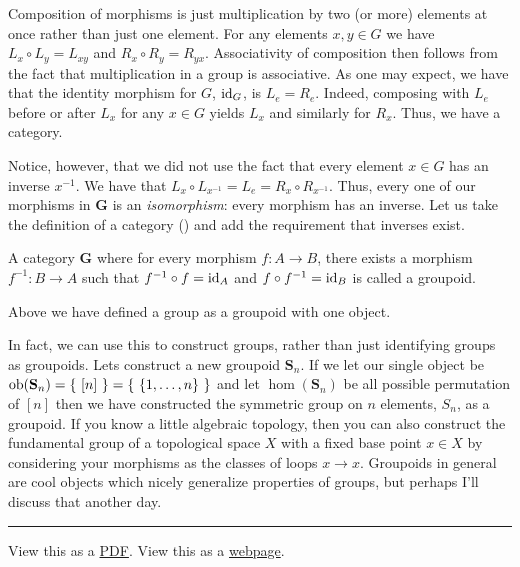 \documentclass{article}
\begin{document}
Composition of morphisms is just multiplication by two (or more) elements at once rather than just one element.
For any elements $x, y \in G$ we have $L_{x} \circ L_{y} = L_{xy}$ and $R_{x} \circ R_{y} = R_{yx}$.
Associativity of composition then follows from the fact that multiplication in a group is associative.
As one may expect, we have that the identity morphism for $G$, $\operatorname{id}_{G}$, is $L_{e} = R_{e}$.
Indeed, composing with $L_{e}$ before or after $L_{x}$ for any $x \in G$ yields $L_{x}$ and similarly for $R_{x}$.
Thus, we have a category.

Notice, however, that we did not use the fact that every element $x \in G$ has an inverse $x^{-1}$.
We have that $L_{x} \circ L_{x^{-1}} = L_{e} = R_{x} \circ R_{x^{-1}}$.
Thus, every one of our morphisms in $\textbf{G}$ is an \emph{isomorphism}: every morphism has an inverse.
Let us take the definition of a category () and add the requirement that inverses exist.
\begin{defn}\label{defn:groupoid}
  A category $\textbf{G}$ where for every morphism $f\colon A \to B$, there exists a morphism $f^{-1}\colon B \to A$ such that $f^{-1} \circ f = \operatorname{id}_{A}$ and $f \circ f^{-1} = \operatorname{id}_{B}$ is called a groupoid.
\end{defn}
Above we have defined a group as a groupoid with one object.

In fact, we can use this to construct groups, rather than just identifying groups as groupoids.
Lets construct a new groupoid $\textbf{S}_{n}$.
If we let our single object be $\operatorname{ob}(\textbf{S}_{n}) = \left\{~[n]~\right\} = \left\{~\{1, \ldots, n\}~\right\}$ and let $\hom(\textbf{S}_{n})$ be all possible permutation of $[n]$ then we have constructed the symmetric group on $n$ elements, $S_{n}$, as a groupoid.
If you know a little algebraic topology, then you can also construct the fundamental group of a topological space $X$ with a fixed base point $x \in X$ by considering your morphisms as the classes of loops $x \to x$.
Groupoids in general are cool objects which nicely generalize properties of groups, but perhaps I'll discuss that another day.

\noindent\rule{\textwidth}{1pt}
\ifplastex
  {\small View this as a \href{other_name.pdf}{PDF}.}
\else
  {\small View this as a \href{https://www.commutative.group/posts/other_name.html}{webpage}.}
\fi
\end{document}
